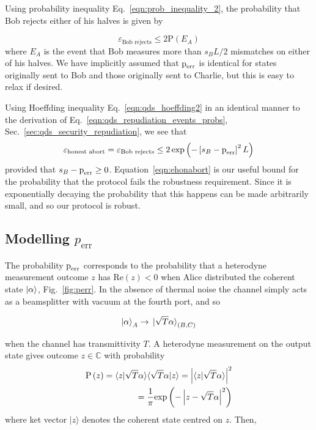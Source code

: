 Using probability inequality Eq.~\ref{eqn:prob_inequality_2}, the probability that Bob rejects either of his halves is given by

\begin{equation}
\varepsilon_{\text{Bob rejects}} \le 2 \text{P}\left(E_A\right)
\end{equation}
where $E_A$ is the event that Bob measures more than $s_B L/2$ mismatches on either of his halves. We have implicitly assumed that $\text{p}_{\text{err}}$ is identical for states originally sent to Bob and those originally sent to Charlie, but this is easy to relax if desired.

Using Hoeffding inequality Eq.~\ref{eqn:qds_hoeffding2} in an identical manner to the derivation of Eq.~\ref{eqn:qds_repudiation_events_probs}, Sec.~\ref{sec:qds_security_repudiation}, we see that
\begin{equation}\label{eqn:ehonabort}
\varepsilon_{\text{honest abort}} = \varepsilon_{\text{Bob rejects}} \le 2 \exp\left( - \left[s_B -\text{p}_{\text{err}}\right]^2 L\right)
\end{equation}
provided that $s_B - \text{p}_{\text{err}} \ge 0$. Equation~\ref{eqn:ehonabort} is our useful bound for the probability that the protocol fails the robustness requirement. Since it is exponentially decaying the probability that this happens can be made arbitrarily small, and so our protocol is robust.

\subsection{Modelling $p_{\text{err}}$}\label{sec:qds_modelling_perr}

The probability $\text{p}_{\text{err}}$ corresponds to the probability that a heterodyne measurement outcome $z$ has $\text{Re}\left(z\right) < 0$ when Alice distributed the coherent state $\ket{\alpha}$, Fig.~\ref{fig:perr}. In the absence of thermal noise the channel simply acts as a beamsplitter with vacuum at the fourth port, and so

\begin{equation}
\ket{\alpha}_A \rightarrow \ket*{\sqrt{T}\alpha}_{\left(B, C\right)}
\end{equation}


\noindent when the channel has transmittivity $T$. A heterodyne measurement on the output state gives outcome $z \in \mathbb{C}$ with probability
\begin{align}
\text{P}\left(z\right) = \langle z | \sqrt{T}\alpha\rangle\langle\sqrt{T}\alpha|z\rangle = \left|\langle z | \sqrt{T} \alpha \rangle \right|^2& \notag \\
= \frac{1}{\pi}\text{exp}\left( - \left| z - \sqrt{T}\alpha \right|^2 \right)&
\end{align}
where ket vector $|z\rangle$ denotes the coherent state centred on $z$. Then,


